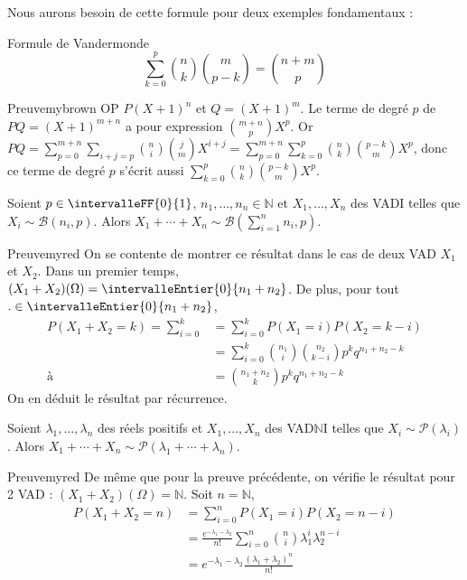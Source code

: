     Nous aurons besoin de cette formule pour deux exemples fondamentaux : 

    \begin{lem}{Formule de Vandermonde}{}
        \[ \sum_{k=0}^{p} \binom{n}{k} \binom{m}{p-k} = \binom{n + m}{p} \]   
    \end{lem}

    \begin{demo}{Preuve}{mybrown}
        OP $P(X + 1)^n$ et $Q = (X + 1)^m$. Le terme de degré $p$ de $PQ = (X + 1)^{m + n}$ a pour expression $\binom{m + n}{p} X^p$. Or $PQ = \sum_{p= 0}^{m + n} \sum_{i + j = p} \binom{n}{i} \binom{j}{m} X^{i+j} = \sum_{p= 0}^{m+n} \sum_{k= 0}^p \binom{n}{k} \binom{p-k}{m} X^p$, donc ce terme de degré $p$ s’écrit aussi $\sum_{k= 0}^p \binom{n}{k} \binom{p-k}{m} X^p$.
    \end{demo}

    \begin{theo}{}{}
        Soient $p \in \intervalleFF{0}{1}$, $n_1,\ldots,n_n \in \mathbb{N}$ et $X_1,\ldots,X_n$ des VADI telles que $X_i \sim \mathcal{B}(n_i, p)$. Alors $X_1 + \cdots + X_n \sim \mathcal{B}(\sum_{i=1}^n n_i, p)$.
    \end{theo}

    \begin{demo}{Preuve}{myred}
        On se contente de montrer ce résultat dans le cas de deux VAD $X_1$ et $X_2$. Dans un premier temps, $(X_1 + X_2)(\Omega) = \intervalleEntier{0}{n_1 + n_2}$. De plus, pour tout $. \in \intervalleEntier{0}{n_1 + n_2}$, 
        \begin{align*}
            P(X_1 + X_2 = k) = \sum_{i = 0}^k &= \sum_{i=0}^k P(X_1 = i) P(X_2 = k - i) \\
            &= \sum_{i=0}^k \binom{n_1}{i} \binom{n_2}{k - i} p^k q^{n_1 + n_2 - k} \\à
            &= \binom{n_1 + n_2}{k} p^k q^{n_1 + n_2 - k} 
        \end{align*}
        On en déduit le résultat par récurrence.
    \end{demo}

    \begin{theo}{}{}
        Soient $\lambda_1,\ldots,\lambda_n$ des réels positifs et $X_1,\ldots,X_n$ des VAD$\mathbb{N}$I telles que $X_i \sim \mathcal{P}(\lambda_i)$. Alors $X_1 + \cdots + X_n \sim \mathcal{P}(\lambda_1 + \cdots + \lambda_n)$.
    \end{theo}

    \begin{demo}{Preuve}{myred}
        De même que pour la preuve précédente, on vérifie le résultat pour 2 VAD : $(X_1 + X_2)(\Omega) = \mathbb{N}$. Soit $n = \mathbb{N}$, 
        \begin{align*}
            P(X_1 + X_2 = n) &= \sum_{i=0}^{n} P(X_1 = i) P(X_2 = n - i) \\
            &= \frac{e^{-\lambda_1 - \lambda_2}}{n!} \sum_{i = 0}^n \binom{n}{i} \lambda_1^i \lambda_2^{n - i} \\
            &= e^{-\lambda_1 - \lambda_2} \frac{(\lambda_1 + \lambda_2)^n}{n!}
        \end{align*}
    \end{demo}

